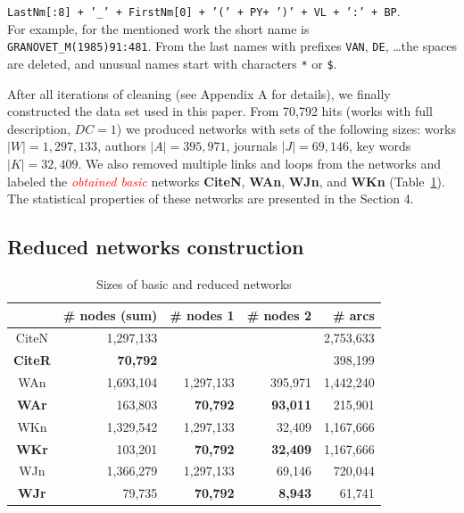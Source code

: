 \documentclass[11pt]{article} %
\newcommand{\keyw}[1]{\textcolor{red}{\emph{#1}}}
\begin{document}
 \texttt {LastNm[:8] \texttt{+ '\_' +} FirstNm[0] \texttt{+ '(' +} PY\texttt{+ ')' +} VL \texttt{+ ':' +} BP}. \smallskip\\ For example, for the mentioned work the short name is \texttt{GRANOVET\_M(1985)91:481}. From the last names with prefixes \texttt{VAN}, \texttt{DE}, \ldots the spaces are deleted, and unusual names start with characters \texttt{*} or \texttt{\$}.\medskip 

After all iterations of cleaning (see Appendix A for details), we finally constructed the data set used in this paper. From 70,792 hits (works with full description, $DC=1$) we produced networks with sets of the following sizes: works $|W| = 1,297,133$, authors $|A| = 395,971$, journals $|J| = 69,146$, key words $|K| = 32,409$. We also removed multiple links and loops from the networks and labeled the \keyw{obtained basic} networks \textbf{CiteN}, \textbf{WAn}, \textbf{WJn}, and \textbf{WKn} (Table~\ref{rednet}). The statistical properties of these networks are presented in the Section 4. \medskip  

\subsection{Reduced networks construction}

\begin{table}
\caption{Sizes of basic and reduced networks}\label{rednet}\medskip
\begin{center}
\begin{tabular}{c|r|r|r|r}
	&\# nodes (sum)	& \# nodes 1	&\# nodes 2	& \# arcs \\ \hline		 
CiteN & 1,297,133 & & & 2,753,633\\ 
\textbf{CiteR} & \textbf{70,792} & & & 398,199 \\ \hline
WAn	& 1,693,104	& 1,297,133	& 395,971	& 1,442,240 \\ 	
\textbf{WAr}	& 163,803	& \textbf{70,792}	& \textbf{93,011}	& 215,901 \\ \hline
WKn &  	1,329,542	& 1,297,133	& 32,409	& 1,167,666 \\  
\textbf{WKr}	& 103,201	& \textbf{70,792}	& \textbf{32,409}	& 1,167,666 \\ \hline
WJn & 	1,366,279	& 1,297,133	& 69,146	& 720,044    \\ 	
\textbf{WJr} 	& 79,735	& \textbf{70,792}	& \textbf{8,943}	& 61,741 \\ \hline
\end{tabular}				
\end{center}
\end{table}
\end{document}
